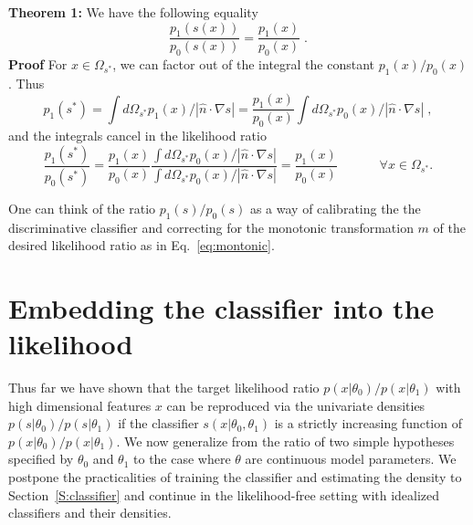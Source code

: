 \documentclass[aoas,preprint]{imsart}
\newcommand{\sstar}{s^*}
\numberwithin{equation}{section}
\theoremstyle{plain}
\begin{document}
\textbf{\flushleft Theorem 1:}
We have the following equality
\begin{equation}
\frac{p_1(s(x))}{p_0(s(x))} =  \frac{p_1(x)}{p_0(x)}  \; . %
\end{equation}
\textbf{Proof}
For $x\in \Omega_{\sstar}$, we can factor out of the integral the constant $p_1(x)/p_0(x)$.
Thus
\begin{equation}
p_1(\sstar) =  \int d\Omega_{\sstar} p_1(x) / | \hat{n} \cdot \nabla s  |= \frac{p_1(x)}{p_0(x)} \int d\Omega_{\sstar} p_0(x)  / | \hat{n} \cdot \nabla s  | \;,
\end{equation}
and the integrals cancel in the likelihood ratio
\begin{equation}
\frac{p_1(\sstar)}{p_0(\sstar)} = \frac{p_1(x)}{p_0(x)} \frac{\int d\Omega_{\sstar} p_0(x)/ | \hat{n} \cdot \nabla s  |}{ \int d\Omega_{\sstar} p_0(x) / | \hat{n} \cdot \nabla s  |} = \frac{p_1(x)}{p_0(x)}  \;\hspace{3em} \forall x\in\Omega_{\sstar}.
\end{equation}

One can think of the ratio $p_1(s)/p_0(s)$ as a way of calibrating the the discriminative classifier and correcting for the monotonic transformation $m$ of the desired likelihood ratio as in Eq.~\ref{eq:montonic}.


\section{Embedding the classifier into the likelihood}

Thus far we have shown that the target likelihood ratio $p(x|\theta_0)/p(x|\theta_1)$ with high dimensional features $x$ can be reproduced via the univariate densities $p(s|\theta_0)/p(s|\theta_1)$ if the classifier $s(x|\theta_0, \theta_1)$ is a strictly increasing function of $p(x|\theta_0)/p(x|\theta_1)$. We now generalize from the ratio of two simple hypotheses specified by $\theta_0$ and $\theta_1$ to the case where $\theta$ are continuous model parameters.
 We postpone the practicalities of training the classifier and estimating the density to Section~\ref{S:classifier} and continue in the likelihood-free setting with idealized classifiers and their densities.
\end{document}
